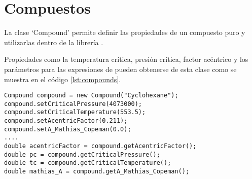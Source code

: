 \section{Compuestos}\label{sec:compounds}

La clase `Compound' permite definir las propiedades de un compuesto puro y utilizarlas dentro de la librería \Materia.

Propiedades como la temperatura crítica, presión crítica, factor acéntrico y los parámetros para las expresiones de \alfa  pueden obtenerse de esta clase como se muestra en el código \ref{lst:compounds}.

\begin{lstlisting}[caption={Se muestra la creación de un objeto tipo `Compound' para definir y utilizar las propiedades del cyclohexano, haciendo uso de los métodos `get' y `set'.},label={lst:compounds}]
Compound compound = new Compound("Cyclohexane");
compound.setCriticalPressure(4073000);
compound.setCriticalTemperature(553.5);
compound.setAcentricFactor(0.211);
compound.setA_Mathias_Copeman(0.0);
....
double acentricFactor = compound.getAcentricFactor();
double pc = compound.getCriticalPressure();
double tc = compound.getCriticalTemperature();
double mathias_A = compound.getA_Mathias_Copeman();
\end{lstlisting}







